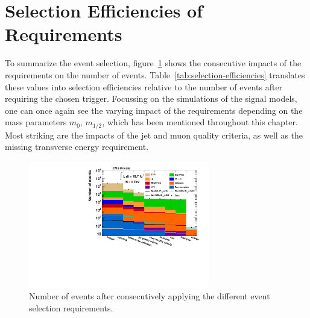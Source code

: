 \section{Selection Efficiencies of Requirements}
\label{sec:requirement-eff}

To summarize the event selection, figure~\ref{fig:cutflow} shows the consecutive impacts of the requirements on the number of events. Table~\ref{tab:selection-efficiencies} translates these values into selection efficiencies relative to the number of events after requiring the chosen trigger. Focussing on the simulations of the signal models, one can once again see the varying impact of the requirements depending on the mass parameters $m_0$, $m_{1/2}$, which has been mentioned throughout this chapter. Most striking are the impacts of the jet and muon quality criteria, as well as the missing transverse energy requirement.

\begin{figure}[!htb]
  \centering
  \includegraphics[width=0.7\textwidth]{plots/cutflow.pdf}
  \caption{Number of events after consecutively applying the different event selection requirements.}
  \label{fig:cutflow}
\end{figure}


